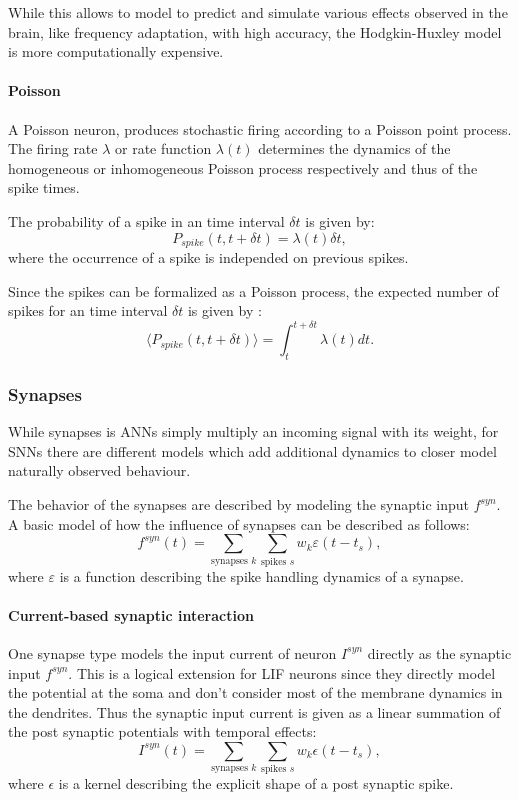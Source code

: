While this allows to model to predict and simulate various effects observed in the brain, like frequency adaptation, with high accuracy, the Hodgkin-Huxley model is more computationally expensive.

\paragraph{Poisson}

A Poisson neuron, produces stochastic firing according to a Poisson point process.
The firing rate $\lambda$ or rate function $\lambda(t)$ determines the dynamics of the homogeneous or inhomogeneous Poisson process respectively and thus of the spike times.   

The probability of a spike in an time interval $\delta t$ is given by: 
\[
P_{spike}({t , t+ \delta t}) = \lambda(t) \delta t,
\]
where the occurrence of a spike is independed on previous spikes. 

Since the spikes can be formalized as a Poisson process, the expected number of spikes for an time interval $\delta t$ is given by :
\[
\langle  P_{spike}({t , t+ \delta t}) \rangle = \int_t^{t + \delta t} \lambda(t) dt.
\]


\subsubsection{Synapses}

While synapses is ANNs simply multiply an incoming signal with its weight, for SNNs there are different models which add additional dynamics to closer model naturally observed behaviour. 

The behavior of the synapses are described by modeling the synaptic input $f^{syn}$. A basic model of how the influence of synapses can be described as follows:
\[
f^{syn}(t) = \sum_{\text{synapses } k } \sum_{\text{spikes } s} w_k \varepsilon(t - t_s),
\]
where $\varepsilon$ is a function describing the spike handling dynamics of a synapse.

\paragraph{Current-based synaptic interaction} One synapse type models the input current of neuron $I^{syn}$ directly as the synaptic input $f^{syn}$. This is a logical extension for LIF neurons since they directly model the potential at the soma and don't consider most of the membrane dynamics in the dendrites. 
Thus the synaptic input current is given as a linear summation of the post synaptic potentials with temporal effects:
\[
I^{syn}(t) = \sum_{\text{synapses } k } \sum_{\text{spikes } s} w_k \epsilon(t - t_s),
\]
where $\epsilon$ is a kernel describing the explicit shape of a post synaptic spike.

